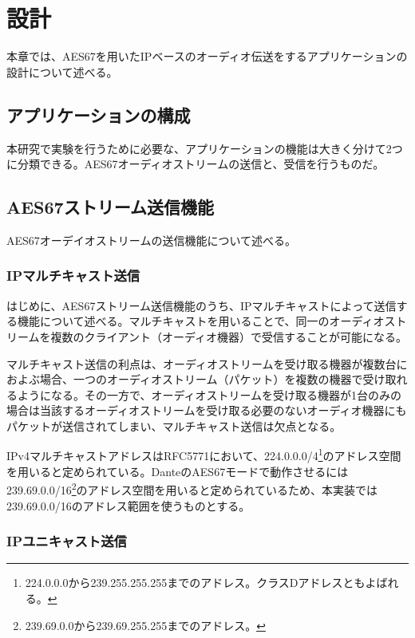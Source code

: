 \chapter{設計}
\label{chap:design}

本章では、AES67を用いたIPベースのオーディオ伝送をするアプリケーションの設計について述べる。

\section{アプリケーションの構成}

本研究で実験を行うために必要な、アプリケーションの機能は大きく分けて2つに分類できる。AES67オーディオストリームの送信と、受信を行うものだ。

\section{AES67ストリーム送信機能}

AES67オーデイオストリームの送信機能について述べる。

\subsection{IPマルチキャスト送信}

はじめに、AES67ストリーム送信機能のうち、IPマルチキャストによって送信する機能について述べる。マルチキャストを用いることで、同一のオーディオストリームを複数のクライアント（オーディオ機器）で受信することが可能になる。

マルチキャスト送信の利点は、オーディオストリームを受け取る機器が複数台におよぶ場合、一つのオーディオストリーム（パケット）を複数の機器で受け取れるようになる。その一方で、オーディオストリームを受け取る機器が1台のみの場合は当該するオーディオストリームを受け取る必要のないオーディオ機器にもパケットが送信されてしまい、マルチキャスト送信は欠点となる。

IPv4マルチキャストアドレスはRFC5771\cite{rfc5771}において、224.0.0.0/4\footnote{224.0.0.0から239.255.255.255までのアドレス。クラスDアドレスともよばれる。}のアドレス空間を用いると定められている。DanteのAES67モードで動作させるには239.69.0.0/16\footnote{239.69.0.0から239.69.255.255までのアドレス。}のアドレス空間を用いると定められているため、本実装では239.69.0.0/16のアドレス範囲を使うものとする。

\subsection{IPユニキャスト送信}

